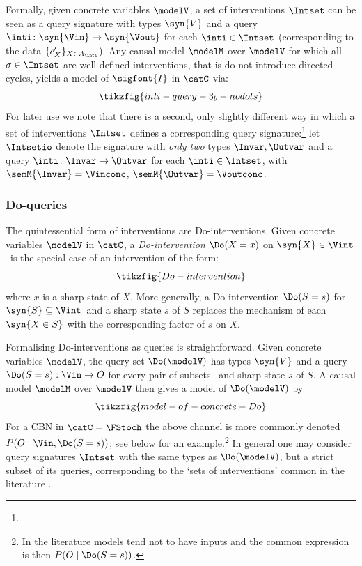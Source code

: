 \documentclass{article}
\begin{document}
Formally, 
given concrete variables $\modelV$, a set of interventions $\Intset$ can be seen as a query signature with types $\syn{V}$ and a query $\inti \colon \syn{\Vin} \to \syn{\Vout}$ for each  $\inti \in \Intset$ (corresponding to the data $\{c'_{X}\}_{X \in A_{\inti}}$). 
Any causal model $\modelM$ over $\modelV$ for which all $\sigma \in \Intset$ are well-defined interventions, that is do not introduce directed cycles, yields a model of $\sigfont{I}$ in $\catC$ via:  
\[ 
		\tikzfig{inti-query-3_b-nodots}
\]
For later use we note that there is a second, only slightly different way in which a set of interventions $\Intset$ defines a corresponding query signature:\footnote{} 
let $\Intsetio$ denote the signature with \emph{only two} types $\Invar, \Outvar$ and a query $\inti \colon \Invar \to \Outvar$ for each $\inti \in \Intset$, with $\semM{\Invar} = \Vinconc$, $\semM{\Outvar} = \Voutconc$. \ 


\subsubsection{Do-queries} 
 
The quintessential form of interventions are Do-interventions. Given concrete variables $\modelV$ 
in $\catC$, a  \emph{Do-intervention} $\Do(X=x)$ on 
\st{$\syn{X} \in \Vint$}\
is the special case of an intervention of the form:
\[
\tikzfig{Do-intervention}
\]
where $x$ is a sharp state of $X$. 
More generally, a Do-intervention $\Do(S=s)$ for \st{$\syn{S} \subseteq \Vint$}\ and 
a sharp state $s$ of $S$ 
replaces the mechanism of each $\syn{X \in S}$ with the corresponding factor of $s$ on $X$.  

Formalising Do-interventions as queries is straightforward. Given concrete variables $\modelV$, the query set $\Do(\modelV)$ has types $\syn{V}$ and a query $\Do(S=s) : \Vin \rightarrow O$ for every pair of subsets \ and sharp state $s$ of $S$. A causal model $\modelM$ over $\modelV$ then gives a model of $\Do(\modelV)$ by
\[
\tikzfig{model-of-concrete-Do}
\]
For a CBN in $\catC=\FStoch$ the above channel is more commonly denoted $P(O \mid \Vin, \Do(S=s))$; see below for an example.\footnote{In the literature models tend not to have inputs and the common expression is then $P(O \mid \Do(S=s))$.}  In general one may consider query signatures $\Intset$ with the same types as $\Do(\modelV)$, but a strict subset of its queries, corresponding to the `sets of interventions' common in the literature \cite{BeckersEtAl_2019_AbstractingCausalModles, rubenstein2017causal}.  
\end{document}
